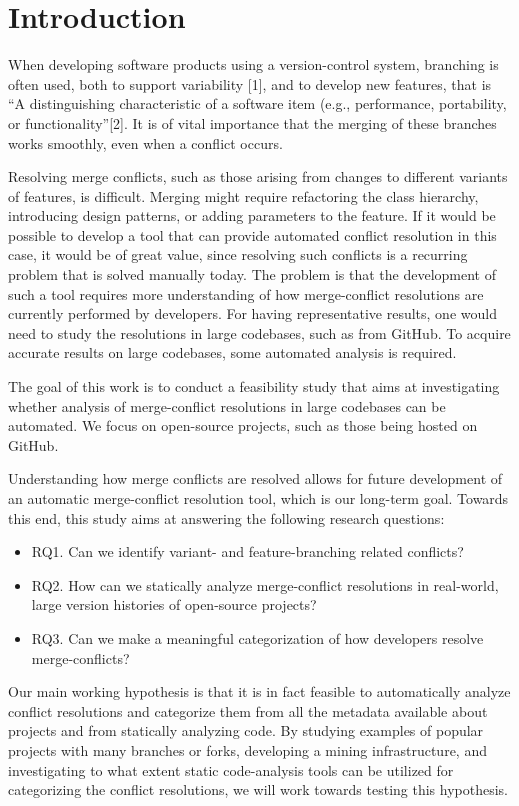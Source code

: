 \chapter{Introduction}
\setlength{\parindent}{0pt}
When developing software products using a version-control system, branching is often used, both to support variability [1], and to develop new features, that is “A distinguishing characteristic of a software item (e.g., performance, portability, or functionality”[2]. It is of vital importance that the merging of these branches works smoothly, even when a conflict occurs.

Resolving merge conflicts, such as those arising from changes to different variants of features, is difficult. Merging might require refactoring the class hierarchy, introducing design patterns, or adding parameters to the feature. If it would be possible to develop a tool that can provide automated conflict resolution in this case, it would be of great value, since resolving such conflicts is a recurring problem that is solved manually today. The problem is that the development of such a tool requires more understanding of how merge-conflict resolutions are currently performed by developers. For having representative results, one would need to study the resolutions in large codebases, such as from GitHub. To acquire accurate results on large codebases, some automated analysis is required.

The goal of this work is to conduct a feasibility study that aims at investigating whether analysis of merge-conflict resolutions in large codebases can be automated. We focus on open-source projects, such as those being hosted on GitHub.

Understanding how merge conflicts are resolved allows for future development of an automatic merge-conflict resolution tool, which is our long-term goal. Towards this end, this study aims at answering the following research questions:
\begin{itemize}
\item RQ1. Can we identify variant- and feature-branching related conflicts?
\item RQ2. How can we statically analyze merge-conflict resolutions in real-world, large version histories of open-source projects?
\item RQ3. Can we make a meaningful categorization of how developers resolve merge-conflicts?
\end{itemize}

Our main working hypothesis is that it is in fact feasible to automatically analyze conflict resolutions and categorize them from all the metadata available about projects and from statically analyzing code. By studying examples of popular projects with many branches or forks, developing a mining infrastructure, and investigating to what extent static code-analysis tools can be utilized for categorizing the conflict resolutions, we will work towards testing this hypothesis.

